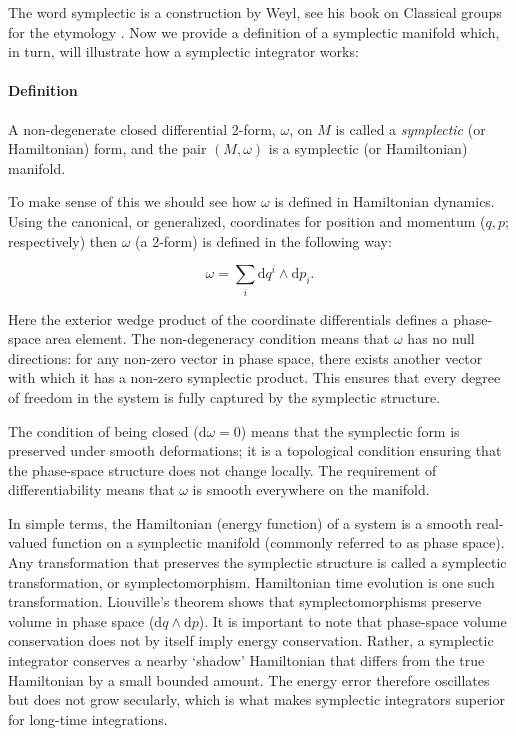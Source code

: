 The word symplectic is a construction by Weyl, see his book on Classical groups for the etymology \citep{bib_weyl2}. Now we provide a definition of a symplectic manifold which, in turn, will illustrate how a symplectic integrator works:

\paragraph{Definition} A non-degenerate closed differential 2-form, $\omega$, on $M$ is called a {\it symplectic} (or Hamiltonian) form, and the pair $(M, \omega)$ is a symplectic (or Hamiltonian) manifold. \citep{bib_tens}

To make sense of this we should see how $\omega$ is defined in Hamiltonian dynamics. Using the canonical, or generalized, coordinates for position and momentum ($q, p$; respectively) then $\omega$ (a 2-form) is defined in the following way:

\begin{equation}
\omega =\sum_i \mathrm{d}q^i \wedge \mathrm{d}p_i.
\end{equation}

\noindent Here the exterior wedge product of the coordinate differentials defines a phase-space area element. The non-degeneracy condition means that $\omega$ has no null directions: for any non-zero vector in phase space, there exists another vector with which it has a non-zero symplectic product. This ensures that every degree of freedom in the system is fully captured by the symplectic structure.

The condition of being closed ($\mathrm{d}\omega = 0$) means that the symplectic form is preserved under smooth deformations; it is a topological condition ensuring that the phase-space structure does not change locally. The requirement of differentiability means that $\omega$ is smooth everywhere on the manifold. \citep{bib_tens}

In simple terms, the Hamiltonian (energy function) of a system is a smooth real-valued function on a symplectic manifold (commonly referred to as phase space). Any transformation that preserves the symplectic structure is called a symplectic transformation, or symplectomorphism. Hamiltonian time evolution is one such transformation. Liouville's theorem shows that symplectomorphisms preserve volume in phase space ($\mathrm{d}q \wedge \mathrm{d}p$). It is important to note that phase-space volume conservation does not by itself imply energy conservation. Rather, a symplectic integrator conserves a nearby `shadow' Hamiltonian that differs from the true Hamiltonian by a small bounded amount. The energy error therefore oscillates but does not grow secularly, which is what makes symplectic integrators superior for long-time integrations.

